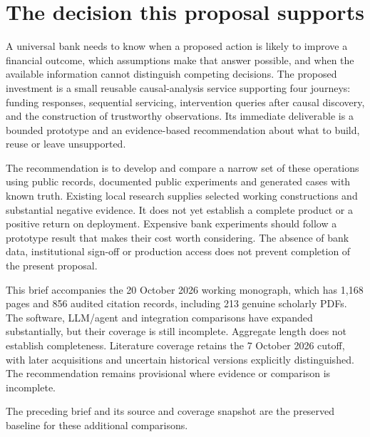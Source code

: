 \hypertarget{the-decision-this-proposal-supports}{%
\section{The decision this proposal
supports}\label{the-decision-this-proposal-supports}}

A universal bank needs to know when a proposed action is likely to
improve a financial outcome, which assumptions make that answer
possible, and when the available information cannot distinguish
competing decisions. The proposed investment is a small reusable
causal-analysis service supporting four journeys: funding responses,
sequential servicing, intervention queries after causal discovery, and
the construction of trustworthy observations. Its immediate deliverable
is a bounded prototype and an evidence-based recommendation about what
to build, reuse or leave unsupported.

The recommendation is to develop and compare a narrow set of these
operations using public records, documented public experiments and
generated cases with known truth. Existing local research supplies
selected working constructions and substantial negative evidence. It
does not yet establish a complete product or a positive return on
deployment. Expensive bank experiments should follow a prototype result
that makes their cost worth considering. The absence of bank data,
institutional sign-off or production access does not prevent completion
of the present proposal. \citep{sp13_scope}

This brief accompanies the 20 October 2026 working monograph, which has
1,168 pages and 856 audited citation records, including 213 genuine
scholarly PDFs. The software, LLM/agent and integration comparisons have
expanded substantially, but their coverage is still incomplete.
Aggregate length does not establish completeness. Literature coverage
retains the 7 October 2026 cutoff, with later acquisitions and uncertain
historical versions explicitly distinguished. The recommendation remains
provisional where evidence or comparison is incomplete.
\citep{sp20md_reader,sp20gf_reader,sp20hy_reader,sp20je_reader,sp20nc_reader,sp20gc_reader,sp20ea_reader,sp20vm_reader,sp20pye_reader,sp20fx_reader,sp20pa_reader,sp20rfx_reader}

The preceding brief and its source and coverage snapshot are the
preserved baseline for these additional comparisons.
\citep{sp18_reader,sp18_progress,sp18_census,sp19rs_reader,sp19rs_progress,sp19em_reader,sp19em_progress,sp19oi_reader,sp19oi_progress}

